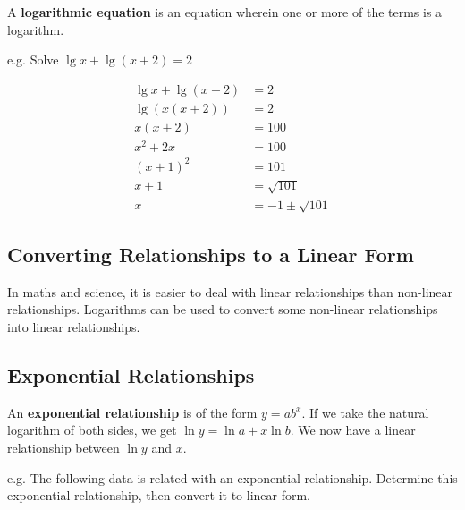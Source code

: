 A \textbf{logarithmic equation} is an equation wherein one or more of the terms is a logarithm.



e.g. Solve $\lg x + \lg (x+2) = 2$



\begin{align} \lg x + \lg (x+2) & = 2 \\ \lg (x(x+2)) & = 2 \\ x(x+2) & = 100 \\ x^2 + 2x & = 100 \\ (x + 1)^2 & = 101 \\ x+1 & = \sqrt{101} \\ x & = -1 \pm \sqrt{101} \end{align}




\subsection{Converting Relationships to a Linear Form}
\label{sss:conv-5ce7}




In maths and science, it is easier to deal with linear relationships than non-linear
relationships. Logarithms can be used to convert some non-linear relationships into linear
relationships.




\subsection{Exponential Relationships}
\label{sss:expo-301f}




An \textbf{exponential relationship} is of the form $y = ab^x$. If we take the natural
logarithm of both sides, we get $\ln y = \ln a + x \ln b$. We now have a linear
relationship between $\ln y$ and $x$.



e.g. The following data is related with an exponential relationship. Determine this
exponential relationship, then convert it to linear form.



